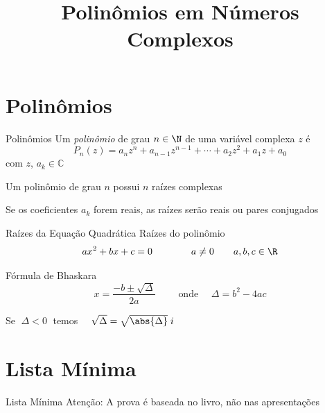 \documentclass[fleqn,utf8,aspectratio=169,12pt]{beamer}
\title{Polinômios em Números Complexos}
\begin{document}
\addtitle

\section{Polinômios}

\begin{frame}{Polinômios}
  Um \emph{polinômio} de grau $n\in\N$ de uma variável complexa $z$ \pause é
  \[
    P_n(z)
    = a_n z^n
    + a_{n-1} z^{n-1}
    + \cdots
    + a_2 z^2
    + a_1 z
    + a_0
  \]
  com \(z\), \(a_k\in\mathbb{C}\)

  \pause
  \vspace{\baselineskip}
  Um polinômio de grau $n$ possui $n$ raízes complexas

  \pause
  \vspace{\baselineskip}
  Se os coeficientes \(a_k\) forem reais, as raízes serão reais ou pares conjugados
\end{frame}

\begin{frame}{Raízes da Equação Quadrática}
  Raízes do polinômio
  \[
    ax^2 + bx + c = 0
    \qquad\qquad
    a\neq 0
    \qquad
    a, b, c \in \R
  \]

  \pause
  Fórmula de Bhaskara
  \[
    x = \dfrac{\displaystyle -b \pm \sqrt{\Delta}}{2a}
    \qquad\text{ onde }\quad
    \Delta = b^2 - 4 ac
  \]

  \pause
  Se \(\;\Delta<0\;\) temos
  \(\quad \sqrt{\Delta} = \sqrt{\abs{\Delta}}\;i \)
\end{frame}




\section{Lista Mínima}

\begin{frame}{Lista Mínima}
  Atenção: A prova é baseada no livro, não nas apresentações
\end{frame}

\end{document}
